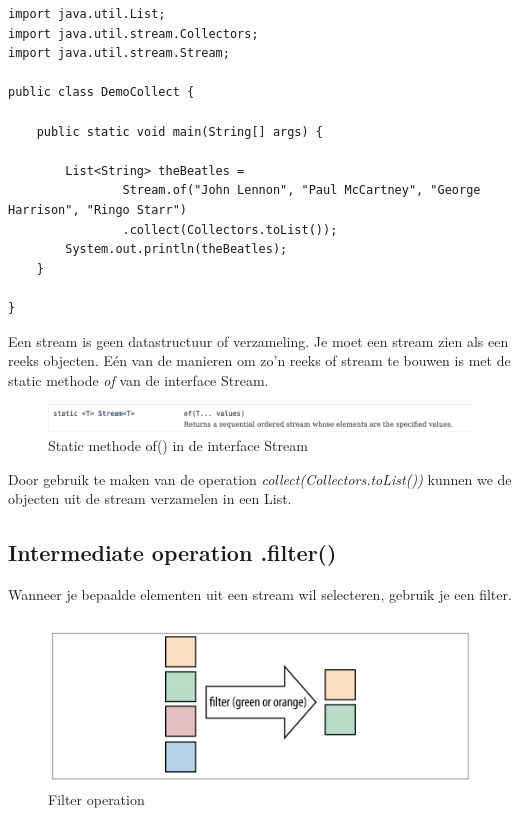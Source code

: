 \documentclass{tstextbook}
\begin{document}
\begin{lstlisting}
import java.util.List;
import java.util.stream.Collectors;
import java.util.stream.Stream;

public class DemoCollect {

	public static void main(String[] args) {

		List<String> theBeatles = 
				Stream.of("John Lennon", "Paul McCartney", "George Harrison", "Ringo Starr")
				.collect(Collectors.toList());
		System.out.println(theBeatles);
	}

}
\end{lstlisting}

Een stream is geen datastructuur of verzameling. Je moet een stream zien als een reeks objecten. E\'en van de manieren om zo'n reeks of stream te bouwen is met de static methode \textit{of} van de interface Stream.

\begin{figure}[H]
  \includegraphics[width=\linewidth]{images/h6/stream_of.png}
  \caption{Static methode of() in de interface Stream}
  \label{fig:stream_of}
\end{figure}

Door gebruik te maken van de operation \textit{collect(Collectors.toList())} kunnen we de objecten uit de stream verzamelen in een List.

\subsection{Intermediate operation .filter()}

Wanneer je bepaalde elementen uit een stream wil selecteren, gebruik je een filter. 

\begin{figure}[H]
  \includegraphics[width=\linewidth]{images/h6/illustration_filter.png}
  \caption{Filter operation}
  \label{fig:filter_operation}
\end{figure}
\end{document}
